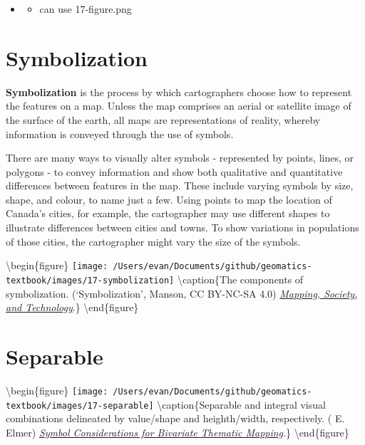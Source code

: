 \documentclass[
]{book}
\providecommand{\tightlist}{%
  \setlength{\itemsep}{0pt}\setlength{\parskip}{0pt}}
\begin{document}
\begin{itemize}
\item
  \begin{itemize}
  \tightlist
  \item
    can use 17-figure.png
  \end{itemize}
\end{itemize}

\hypertarget{symbolization}{%
\section{Symbolization}\label{symbolization}}

\textbf{Symbolization} is the process by which cartographers choose how to represent the features on a map. Unless the map comprises an aerial or satellite image of the surface of the earth, all maps are representations of reality, whereby information is conveyed through the use of symbols.

There are many ways to visually alter symbols - represented by points, lines, or polygons - to convey information and show both qualitative and quantitative differences between features in the map. These include varying symbols by size, shape, and colour, to name just a few. Using points to map the location of Canada's cities, for example, the cartographer may use different shapes to illustrate differences between cities and towns. To show variations in populations of those cities, the cartographer might vary the size of the symbols.

\textbackslash begin\{figure\}
\texttt{[image: /Users/evan/Documents/github/geomatics-textbook/images/17-symbolization]} \textbackslash caption\{The components of symbolization. (`Symbolization', \citet{Steven} Manson, CC BY-NC-SA 4.0) \href{https://open.lib.umn.edu/mapping/chapter/4-design-and-symbolization/\#return-footnote-399-6}{\emph{Mapping, Society, and Technology}}.\}\label{fig:17-symbolization}
\textbackslash end\{figure\}

\hypertarget{separable}{%
\section{Separable}\label{separable}}

\textbackslash begin\{figure\}
\texttt{[image: /Users/evan/Documents/github/geomatics-textbook/images/17-separable]} \textbackslash caption\{Separable and integral visual combinations delineated by value/shape and heighth/width, respectively. (\citet{Martin} E. Elmer) \href{https://minds.wisconsin.edu/bitstream/handle/1793/67887/Elmer\%20Martin\%20E\%202012.pdf?sequence=1\&isAllowed=y}{\emph{Symbol Considerations for Bivariate Thematic Mapping}}.\}\label{fig:17-separable}
\textbackslash end\{figure\}
\end{document}
